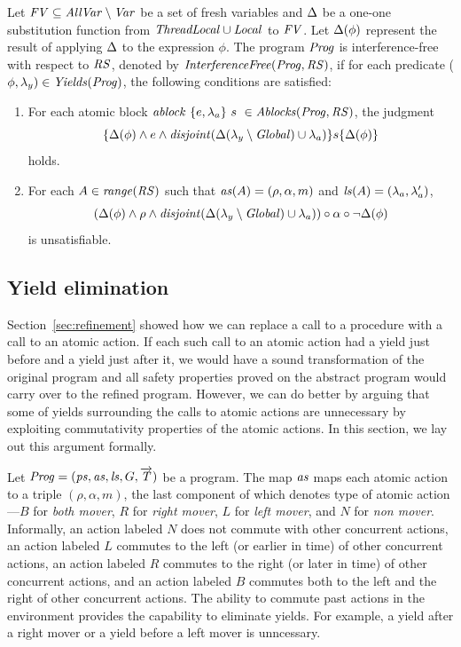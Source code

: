 Let $\mathit{FV} \subseteq \mathit{AllVar} \setminus \mathit{Var}$ be a set of fresh variables and $\Delta$ be a one-one 
substitution function from $\mathit{ThreadLocal} \cup \mathit{Local}$ to $\mathit{FV}$.
Let $\Delta(\phi)$ represent the result of applying $\Delta$ to the expression $\phi$.
The program $\mathit{Prog}$ is interference-free with respect to $\mathit{RS}$, denoted by $\mathit{InterferenceFree}(\mathit{Prog},\mathit{RS})$,
if for each predicate ($\phi,\lambda_y) \in \mathit{Yields}(\mathit{Prog})$, the following conditions are satisfied:
\begin{enumerate}
\item
For each atomic block $\mathit{ablock}\ {\{e,\lambda_a\}}\ {s}\  \in \mathit{Ablocks}(\mathit{Prog},\mathit{RS})$, the judgment
\[
\{\Delta(\phi) \wedge e \wedge \mathit{disjoint}(\Delta(\lambda_y \setminus \mathit{Global}) \cup \lambda_a)\} s \{\Delta(\phi)\}
\]
holds.
\item
For each $A \in \mathit{range}(\mathit{RS})$ such that $\mathit{as}(A) = (\rho, \alpha, m)$ and $\mathit{ls}(A) = (\lambda_a,\lambda'_a)$, 
\[
(\Delta(\phi) \wedge \rho \wedge \mathit{disjoint}(\Delta(\lambda_y \setminus \mathit{Global}) \cup \lambda_a)) \circ \alpha \circ \neg\Delta(\phi)
\]
is unsatisfiable.
\end{enumerate}

\subsection{Yield elimination}
\label{sec:yield-elimination}

Section~\ref{sec:refinement} showed how we can replace a call to a procedure with 
a call to an atomic action.
If each such call to an atomic action had a yield just before and a yield just after it,
we would have a sound transformation of the original program and all safety properties proved
on the abstract program would carry over to the refined program.
However, we can do better by arguing that some of yields surrounding the calls to atomic actions 
are unnecessary by exploiting commutativity properties of the atomic actions.
In this section, we lay out this argument formally.

Let $\mathit{Prog} = (\mathit{ps}, \mathit{as}, \mathit{ls}, G, \overrightarrow{\mathit{T}})$ be a program.
The map $\mathit{as}$ maps each atomic action to a triple $(\rho, \alpha, m)$, the last component of which 
denotes type of atomic action---$B$ for {\em both mover}, $R$ for {\em right mover}, $L$ for {\em left mover},
and $N$ for {\em non mover}.
Informally, an action labeled $N$ does not commute with other concurrent actions,
an action labeled $L$ commutes to the left (or earlier in time) of other concurrent actions,
an action labeled $R$ commutes to the right (or later in time) of other concurrent actions,
and an action labeled $B$ commutes both to the left and the right of other concurrent actions.
The ability to commute past actions in the environment provides the capability to eliminate yields.
For example, a yield after a right mover or a yield before a left mover is unncessary.

